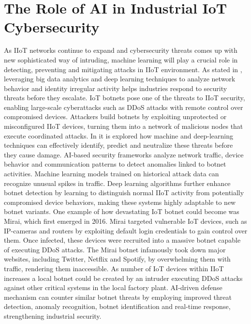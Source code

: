 \documentclass[article,a4paper]{IEEEtran}
\begin{document}
\section{The Role of AI in Industrial IoT Cybersecurity}
As IIoT networks continue to expand and cybersecurity threats comes up with new sophisticated way of intruding, machine learning will play a crucial role in detecting, preventing and mitigating attacks in IIoT environment. As stated in \cite{Deeplearning}, leveraging big data analytics and deep learning techniques to analyze network behavior and identity irregular activity helps industries respond to security threats before they escalate. 
\newline\newline
IoT botnets pose one of the threats to IIoT security, enabling large-scale cyberattacks such as DDoS attacks with remote control over compromised devices. Attackers build botnets by exploiting unprotected or misconfigured IIoT devices, turning them into a network of malicious nodes that execute coordinated attacks. In \cite{botnets} it is explored how machine and deep-learning techniques can effectively identify, predict and neutralize these threats before they cause damage. 
\newline\newline
AI-based security frameworks analyze network traffic, device behavior and communication patterns to detect anomalies linked to botnet activities. Machine learning models trained on historical attack data can recognize unusual spikes in traffic. Deep learning algorithms further enhance botnet detection by learning to distinguish normal IIoT activity from potentially compromised device behaviors, making these systems highly adaptable to new botnet variants. 
\newline\newline
One example \cite{Mirai} of how devastating IoT botnet could become was Mirai, which first emerged in 2016. Mirai targeted vulnerable IoT devices, such as IP-cameras and routers by exploiting default login credentials to gain control over them. Once infected, these devices were recruited into a massive botnet capable of executing DDoS attacks. The Mirai botnet infamously took down major websites, including Twitter, Netflix and Spotify, by overwhelming them with traffic, rendering them inaccessible. As number of IoT devices within IIoT increases a local botnet could be created by an intruder executing DDoS attacks against other critical systems in the local factory plant. 
\newline
AI-driven defense mechanism can counter similar botnet threats by employing improved threat detection, anomaly recognition, botnet identification and real-time response, strengthening industrial security. 
\end{document}
